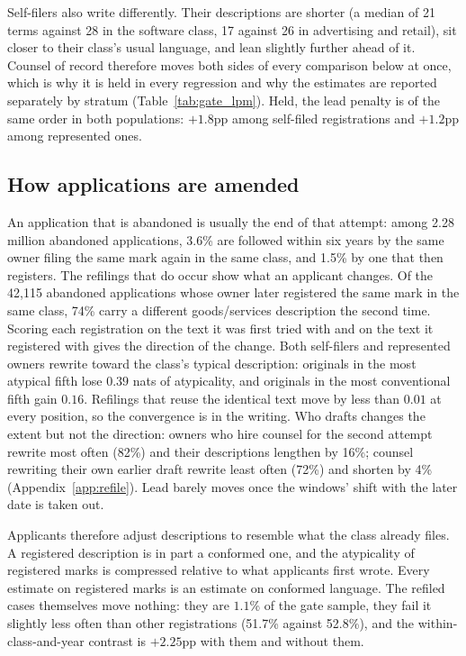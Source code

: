 Self-filers also write differently. Their descriptions are shorter (a median
of 21 terms against 28 in the software class, 17 against 26 in advertising
and retail), sit closer to their class's usual language, and lean slightly
further ahead of it. Counsel of record therefore moves both sides of every
comparison below at once, which is why it is held in every regression and
why the estimates are reported separately by stratum
(Table~\ref{tab:gate_lpm}). Held, the lead penalty is of the same order in
both populations: $+1.8$pp among self-filed registrations and $+1.2$pp among
represented ones.

\subsection{How applications are amended}\label{sec:amend}

An application that is abandoned is usually the end of that attempt: among
2.28 million abandoned applications, 3.6\% are followed within six years by
the same owner filing the same mark again in the same class, and 1.5\% by
one that then registers. The refilings that do occur show what an applicant
changes. Of the 42{,}115 abandoned applications whose owner later registered
the same mark in the same class, 74\% carry a different goods/services
description the second time. Scoring each registration on the text it was
first tried with and on the text it registered with gives the direction of
the change. Both self-filers and represented owners rewrite toward the
class's typical description: originals in the most atypical fifth lose
$0.39$ nats of atypicality, and originals in the most conventional fifth
gain $0.16$. Refilings that reuse the identical text move by less than
$0.01$ at every position, so the convergence is in the writing.
Who drafts changes the extent but not the direction: owners who hire
counsel for the second attempt rewrite most often (82\%) and their
descriptions lengthen by 16\%; counsel rewriting their own earlier draft
rewrite least often (72\%) and shorten by 4\% (Appendix~\ref{app:refile}).
Lead barely moves once the windows' shift with the later date is taken out.

Applicants therefore adjust descriptions to resemble what the class already
files. A registered description is in part a conformed one, and the
atypicality of registered marks is compressed relative to what applicants
first wrote. Every estimate on registered marks is an estimate on conformed
language. The refiled cases themselves move nothing: they are $1.1$\% of the
gate sample, they fail it slightly less often than other registrations
(51.7\% against 52.8\%), and the within-class-and-year contrast is $+2.25$pp
with them and without them.

